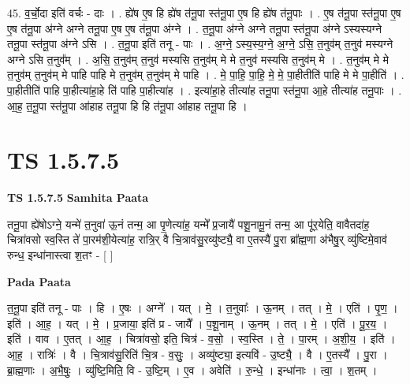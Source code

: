 \documentclass[17pt]{extarticle}
\begin{document}
45. व॒र्चो॒दा इति॑ वर्चः - दाः । . ह्ये॑ष ए॒ष हि ह्ये॑ष त॑नू॒पा स्त॑नू॒पा ए॒ष हि ह्ये॑ष त॑नू॒पाः । . ए॒ष त॑नू॒पा स्त॑नू॒पा ए॒ष ए॒ष त॑नू॒पा अ॑ग्ने अग्ने तनू॒पा ए॒ष ए॒ष त॑नू॒पा अ॑ग्ने । . त॒नू॒पा अ॑ग्ने अग्ने तनू॒पा स्त॑नू॒पा अ॑ग्ने ऽस्यस्यग्ने तनू॒पा स्त॑नू॒पा अ॑ग्ने ऽसि । . त॒नू॒पा इति॑ तनू - पाः । . अ॒ग्ने॒ ऽस्य॒स्य॒ग्ने॒ अ॒ग्ने॒ ऽसि॒ त॒नुव॑म् त॒नुव॑ मस्यग्ने अग्ने ऽसि त॒नुव᳚म् । . अ॒सि॒ त॒नुव॑म् त॒नुव॑ मस्यसि त॒नुव॑म् मे मे त॒नुव॑ मस्यसि त॒नुव॑म् मे । . त॒नुव॑म् मे मे त॒नुव॑म् त॒नुव॑म् मे पाहि पाहि मे त॒नुव॑म् त॒नुव॑म् मे पाहि । . मे॒ पा॒हि॒ पा॒हि॒ मे॒ मे॒ पा॒हीतीति॑ पाहि मे मे पा॒हीति॑ । . पा॒हीतीति॑ पाहि पा॒हीत्या॑हा॒हे ति॑ पाहि पा॒हीत्या॑ह । . इत्या॑हा॒हे तीत्या॑ह तनू॒पा स्त॑नू॒पा आ॒हे तीत्या॑ह तनू॒पाः । . आ॒ह॒ त॒नू॒पा स्त॑नू॒पा आ॑हाह तनू॒पा हि हि त॑नू॒पा आ॑हाह तनू॒पा हि । \newline
\pagebreak
{}
\section*{ TS 1.5.7.5 }

\textbf{TS 1.5.7.5 } \newline
\textbf{Samhita Paata} \newline

तनू॒पा ह्ये॑षोऽग्ने॒ यन्मे॑ त॒नुवा॑ ऊ॒नं तन्म॒ आ पृ॒णेत्या॑ह॒ यन्मे᳚ प्र॒जायै॑ पशू॒नामू॒नं तन्म॒ आ पू॑र॒येति॒ वावैतदा॑ह॒ चित्रा॑वसो स्व॒स्ति ते॑ पा॒रम॑शी॒येत्या॑ह॒ रात्रि॒र् वै चि॒त्राव॑सु॒रव्यु॑ष्ट्यै॒ वा ए॒तस्यै॑ पु॒रा ब्रा᳚ह्म॒णा अ॑भैषु॒र् व्यु॑ष्टिमे॒वाव॑ रुन्ध॒ इन्धा॑नास्त्वा श॒तꣳ - [ ] \newline

\textbf{Pada Paata} \newline

त॒नू॒पा इति॑ तनू - पाः । हि । ए॒षः । अग्ने᳚ । यत् । मे॒ । त॒नुवाः᳚ । ऊ॒नम् । तत् । मे॒ । एति॑ । पृ॒ण॒ । इति॑ । आ॒ह॒ । यत् । मे॒ । प्र॒जाया॒ इति॑ प्र - जायै᳚ । प॒शू॒नाम् । ऊ॒नम् । तत् । मे॒ । एति॑ । पू॒र॒य॒ । इति॑ । वाव । ए॒तत् । आ॒ह॒ । चित्रा॑वसो॒ इति॒ चित्र॑ - व॒सो॒ । स्व॒स्ति । ते॒ । पा॒रम् । अ॒शी॒य॒ । इति॑ । आ॒ह॒ । रात्रिः॑ । वै । चि॒त्राव॑सु॒रिति॑ चि॒त्र - व॒सुः॒ । अव्यु॑ष्ट्या॒ इत्यवि॑ - उ॒ष्ट्यै॒ । वै । ए॒तस्यै᳚ । पु॒रा । ब्रा॒ह्म॒णाः । अ॒भै॒षुः॒ । व्यु॑ष्टि॒मिति॒ वि - उ॒ष्टि॒म् । ए॒व । अवेति॑ । रु॒न्धे॒ । इन्धा॑नाः । त्वा॒ । श॒तम् ।  \newline
\end{document}
